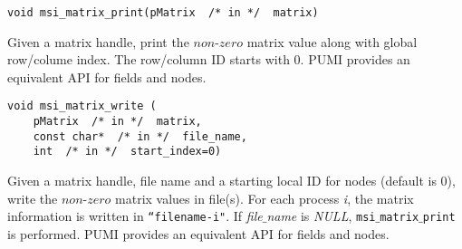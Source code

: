 \begin{verbatim}
void msi_matrix_print(pMatrix  /* in */  matrix)
\end{verbatim}\vspace{-.5cm}\hspace{1cm}
Given a matrix handle, print the $non$-$zero$ matrix value along with global row/colume index. The row/column ID starts with 0. PUMI provides an equivalent API for fields and nodes.

\begin{verbatim}
void msi_matrix_write (
    pMatrix  /* in */  matrix, 
    const char*  /* in */  file_name, 
    int  /* in */  start_index=0)
\end{verbatim}\vspace{-.5cm}\hspace{1cm}
Given a matrix handle, file name and a starting local ID for nodes (default is 0), write the $non$-$zero$ matrix values in file(s). For each process \textit{i}, the matrix information is written in \texttt{``filename-i"}. If \textit{file$\_$name} is \textit{NULL}, \texttt{msi$\_$matrix$\_$print} is performed.
PUMI provides an equivalent API for fields and nodes. 
